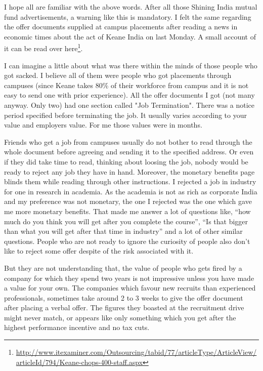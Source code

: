 \vskip 2pt

{\engtext
I hope all are familiar with the above words. After all those Shining India mutual fund advertisements, a warning like this is mandatory. I felt the same regarding the offer documents supplied at campus placements after reading a news in economic times about the act of Keane India on last Monday. A small account of it can be read over here\footnote{\url{http://www.itexaminer.com/Outsourcing/tabid/77/articleType/ArticleView/articleId/794/Keane-chops-400-staff.aspx}}.

I can imagine a little about what was there within the minds of those people who got sacked. I believe all of them were people who got placements through campuses (since Keane takes 80\% of their workforce from campus and it is not easy to send one with prior experience). All the offer documents I got (not many anyway. Only two) had one section called "Job Termination". There was a notice period specified before terminating the job. It usually varies according to your value and employers value. For me those values were in months.

Friends who get a job from campuses usually do not bother to read through the whole document before agreeing and sending it to the specified address. Or even if they did take time to read, thinking about loosing the job, nobody would be ready to reject any job they have in hand. Moreover, the monetary benefits page blinds them while reading through other instructions. I rejected a job in industry for one in research in academia. As the academia is not as rich as corporate India and my preference was not monetary, the one I rejected was the one which gave me more monetary benefits. That made me answer a lot of questions like, ``how much do you think you will get after you complete the course'', ``Is that bigger than what you will get after that time in industry'' and a lot of other similar questions. People who are not ready to ignore the curiosity of people also don’t like to reject some offer despite of the risk associated with it.

But they are not understanding that, the value of people who gets fired by a company for which they spend two years is not impressive unless you have made a value for your own. The companies which favour new recruits than experienced professionals, sometimes take around 2 to 3 weeks to give the offer document after placing a verbal offer. The figures they boasted at the recruitment drive might never match, or appears like only something which you get after the highest performance incentive and no tax cuts. 

}
